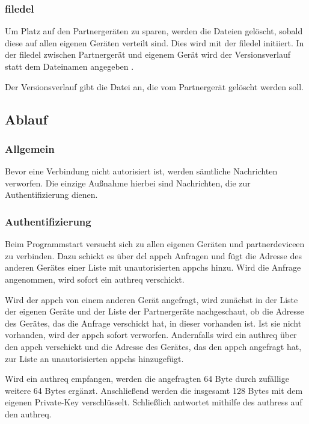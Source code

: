 \subsubsection{\gls{filedel}}
\sblitfiledelpartbytefield
Um Platz auf den Partnergeräten zu sparen, werden die Dateien gelöscht, sobald diese auf allen eigenen Geräten verteilt sind. Dies wird mit der \gls{filedel} initiiert. In der \gls{filedel} zwischen Partnergerät und eigenem Gerät wird der Versionsverlauf statt dem Dateinamen angegeben .
\begin{description}
	Der Versionsverlauf gibt die Datei an, die vom Partnergerät gelöscht werden soll. 
\end{description}

\subsection{Ablauf}
\subsubsection{Allgemein}
Bevor eine Verbindung nicht autorisiert ist, werden sämtliche Nachrichten verworfen. Die einzige Außnahme hierbei sind Nachrichten, die zur Authentifizierung dienen. 

\subsubsection{Authentifizierung}
Beim Programmstart versucht sich \sblit zu allen eigenen Geräten und \gls{partnerdevice}en zu verbinden. Dazu schickt es über \gls{dcl} \gls{appch} Anfragen und fügt die Adresse des anderen Gerätes einer Liste mit unautorisierten \gls{appch}s hinzu. Wird die Anfrage angenommen, wird sofort ein \gls{authreq} verschickt. 

Wird der \gls{appch} von einem anderen Gerät angefragt, wird zunächst in der Liste der eigenen Geräte  und der Liste der Partnergeräte  nachgeschaut, ob die Adresse des Gerätes, das die Anfrage verschickt hat, in dieser vorhanden ist. Ist sie nicht vorhanden, wird der \gls{appch} sofort verworfen. Andernfalls wird ein \gls{authreq} über den \gls{appch} verschickt und die Adresse des Gerätes, das den \gls{appch} angefragt hat, zur Liste an unautorisierten \gls{appch}s hinzugefügt.

Wird ein \gls{authreq} empfangen, werden die angefragten 64 Byte durch zufällige weitere 64 Bytes ergänzt. Anschließend werden die insgesamt 128 Bytes mit dem eigenen Private-Key verschlüsselt. Schließlich antwortet \sblit mithilfe des \gls{authres}s auf den \gls{authreq}.

